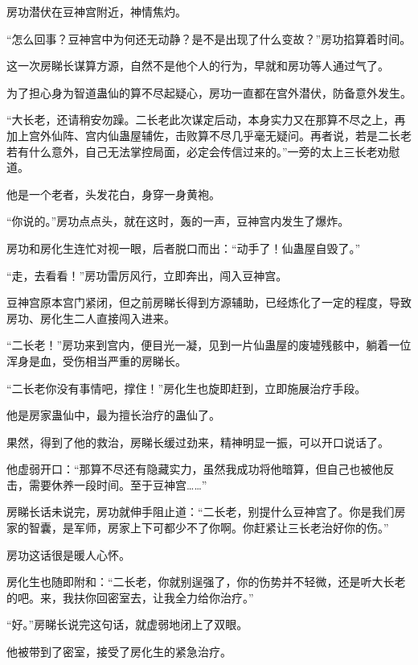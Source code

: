 
\begin{this_body}



房功潜伏在豆神宫附近，神情焦灼。

“怎么回事？豆神宫中为何还无动静？是不是出现了什么变故？”房功掐算着时间。

这一次房睇长谋算方源，自然不是他个人的行为，早就和房功等人通过气了。

为了担心身为智道蛊仙的算不尽起疑心，房功一直都在宫外潜伏，防备意外发生。

“大长老，还请稍安勿躁。二长老此次谋定后动，本身实力又在那算不尽之上，再加上宫外仙阵、宫内仙蛊屋辅佐，击败算不尽几乎毫无疑问。再者说，若是二长老若有什么意外，自己无法掌控局面，必定会传信过来的。”一旁的太上三长老劝慰道。

他是一个老者，头发花白，身穿一身黄袍。

“你说的。”房功点点头，就在这时，轰的一声，豆神宫内发生了爆炸。

房功和房化生连忙对视一眼，后者脱口而出：“动手了！仙蛊屋自毁了。”

“走，去看看！”房功雷厉风行，立即奔出，闯入豆神宫。

豆神宫原本宫门紧闭，但之前房睇长得到方源辅助，已经炼化了一定的程度，导致房功、房化生二人直接闯入进来。

“二长老！”房功来到宫内，便目光一凝，见到一片仙蛊屋的废墟残骸中，躺着一位浑身是血，受伤相当严重的房睇长。

“二长老你没有事情吧，撑住！”房化生也旋即赶到，立即施展治疗手段。

他是房家蛊仙中，最为擅长治疗的蛊仙了。

果然，得到了他的救治，房睇长缓过劲来，精神明显一振，可以开口说话了。

他虚弱开口：“那算不尽还有隐藏实力，虽然我成功将他暗算，但自己也被他反击，需要休养一段时间。至于豆神宫……”

房睇长话未说完，房功就伸手阻止道：“二长老，别提什么豆神宫了。你是我们房家的智囊，是军师，房家上下可都少不了你啊。你赶紧让三长老治好你的伤。”

房功这话很是暖人心怀。

房化生也随即附和：“二长老，你就别逞强了，你的伤势并不轻微，还是听大长老的吧。来，我扶你回密室去，让我全力给你治疗。”

“好。”房睇长说完这句话，就虚弱地闭上了双眼。

他被带到了密室，接受了房化生的紧急治疗。


\end{this_body}
